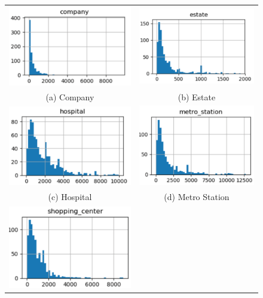 \documentclass[runningheads]{llncs}
\begin{document}
\begin{figure}[!htbp]
	\begin{tabular}{cc}
		\includegraphics[width=0.45\columnwidth]{./figures/company.pdf} &  \includegraphics[width=0.45\columnwidth]{./figures/estate.pdf} \\
		(a) Company & (b) Estate \\[6pt] 
		\includegraphics[width=0.45\columnwidth]{./figures/hospital.pdf} &
		\includegraphics[width=0.45\columnwidth]{./figures/metro.pdf} \\
		(c) Hospital & (d) Metro Station \\
		\includegraphics[width=0.45\columnwidth]{./figures/shop.pdf} 

\end{tabular}
\end{figure}
\end{document}
